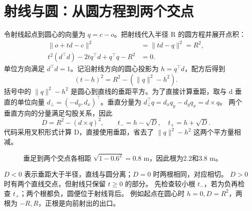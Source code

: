 \section{射线与圆：从圆方程到两个交点}
令射线起点到圆心的向量为 $q=c-o$。把射线代入半径 R 的圆方程并展开点积：
\begin{align}
\|o+td-c\|^2&=\|td-q\|^2=R^2,\\
t^2(d^\top d)-2tq^\top d+q^\top q-R^2&=0.
\end{align}
单位方向满足 $d^\top d=1$。记沿射线方向的圆心投影为 $h=q^\top d$，配方后得到
\begin{equation}
(t-h)^2=R^2-(\|q\|^2-h^2).
\end{equation}
括号中的 $\|q\|^2-h^2$ 是圆心到直线的垂距平方。为了直接计算垂距，取与 d 垂直的单位向量
$d_\perp=(-d_y,d_x)^\top$。垂直分量为 $d_\perp^\top q=d_xq_y-d_yq_x=d\times q$。
两个垂直方向的分量满足勾股关系，因此
\begin{equation}
D=R^2-(d\times q)^2,\qquad t_-=h-\sqrt D,\quad t_+=h+\sqrt D.
\end{equation}
代码采用叉积形式计算 D，直接使用垂距，省去了 $\|q\|^2-h^2$ 这两个平方量相减。

\begin{figure}[ht]
\centering
{}
\caption{垂足到两个交点各相距 $\sqrt{1-0.6^2}=0.8$ m，因此根为2.2和3.8 m。}
\end{figure}

$D<0$ 表示垂距大于半径，直线与圆分离；$D=0$ 时两根相同，对应相切。
$D>0$ 时有两个直线交点，但射线只保留 $t\geq0$ 的部分。
先检查较小根 $t_-$，若为负再检查 $t_+$；两个根都负，圆便位于射线背后。
例如起点在圆心时 $h=0,D=R^2$，两根为 $-R,R$，正根是向前射出的出口。

\par\noindent\begin{minipage}{\linewidth}

\end{minipage}\par

